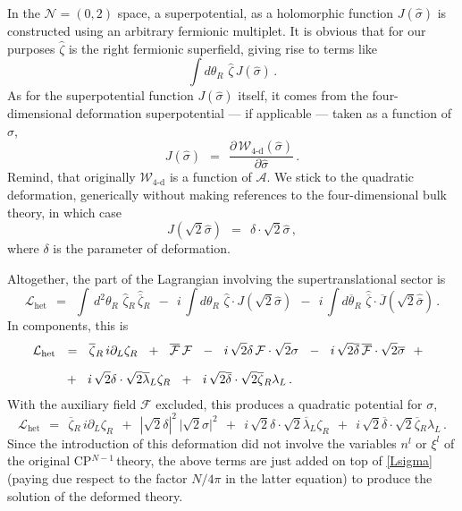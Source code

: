 \documentclass[epsfig,12pt]{article}
\def\beq{\begin{equation}}
\def\eeq{\end{equation}}
\newcommand{\ntwoo}{${\mathcal N}= \left(0,2\right) $ }
\newcommand{\ca}{{\mathcal A}}
\newcommand{\cell}{{\mathcal L}}
\newcommand{\cw}{{\mathcal W}}
\newcommand{\cfe}{{\mathcal F}}
\newcommand{\p}{\partial}
\newcommand{\ov}{\overline}
\newcommand{\cpn}{CP$^{N-1}$\,}
\newcommand{\hsigma}{\hat\sigma{}}
\newcommand{\hbsigma}{\hat{\ov\sigma}{}}
\newcommand{\hzeta}{\hat\zeta{}}
\newcommand{\hbzeta}{\hat{\ov\zeta}{}}
\begin{document}
	In the \ntwoo space, a superpotential, as a holomorphic function $ J(\hsigma) $ is constructed 
	using an arbitrary fermionic multiplet. It is obvious that for our purposes $ \hzeta $ is the
	right fermionic superfield, giving rise to terms like
\beq
	\int d\theta_R\,\, \hzeta\, J(\hsigma)\,.
\eeq
	As for the superpotential function $ J(\hsigma) $ itself, it comes from the four-dimensional
	deformation superpotential --- if applicable --- taken as a function of $ \hsigma $,
\beq
	J(\hsigma)    ~~=~~    \frac{\p\, \cw_\text{4-d}(\hsigma)}{\p \hsigma}\,.
\eeq
	Remind, that originally $ \cw_\text{4-d} $ is a function of $ \ca $. 
	We stick to the quadratic deformation, generically without making references to the four-dimensional
	bulk theory, in which case
\beq
	J(\sqrt{2}\hsigma)    ~~=~~    \delta\cdot \sqrt{2}\hsigma\,,
\eeq
	where $ \delta $ is the parameter of deformation.

	Altogether, the part of the Lagrangian involving the supertranslational sector is
\beq
	\cell_\text{het}    ~~=~~
	\int\, d^2\theta_R\,\, \hzeta_R\, \hbzeta_R
	~~-~~
	i\, \int d\theta_R\,\, \hzeta\cdot J(\sqrt{2}\hsigma)
	~~-~~
	i\, \int d\ov\theta{}_R\,\, \hbzeta\cdot \ov J(\sqrt{2}\hbsigma)\,.
\eeq
	In components, this is
\begin{align}
%
\notag
	\cell_\text{het} &   ~~=~~
		\ov\zeta{}_R\, i\p_L \zeta_R  ~~+~~  \ov\cfe\,\cfe  
		~~-~~  i\,\sqrt{2}\delta\, \cfe \cdot \sqrt{2}\sigma
		~~-~~  i\,\sqrt{2}\ov\delta\, \ov\cfe \cdot \sqrt{2}\ov\sigma
		~~+~~
	\\[2mm]
%
		&
		~~+~~  i\,\sqrt{2}\delta \cdot \sqrt{2}\ov\lambda{}_L \zeta_R
		~~+~~  i\,\sqrt{2}\ov\delta \cdot \sqrt{2}\ov\zeta{}_R \lambda_L\,.
\end{align}
	With the auxiliary field $ \cfe $ excluded, this produces a quadratic potential
	for $ \sigma $,
\beq
	\cell_\text{het}   ~~=~~
		\ov\zeta{}_R\, i\p_L \zeta_R
		~~+~~  |\sqrt{2}\delta|^2\, \big|\sqrt{2}\sigma\big|^2
		~~+~~  i\,\sqrt{2}\delta \cdot \sqrt{2}\ov\lambda{}_L \zeta_R
		~~+~~  i\,\sqrt{2}\ov\delta \cdot \sqrt{2}\ov\zeta{}_R \lambda_L\,.
\eeq
	Since the introduction of this deformation did not involve
	the variables $ n^l $ or $ \xi^l $ of the original \cpn theory,
	the above terms are just added on top of \eqref{Lsigma}
	(paying due respect to the factor $ N/4\pi $ in the latter equation) to produce
	the solution of the deformed theory.


\end{document}
